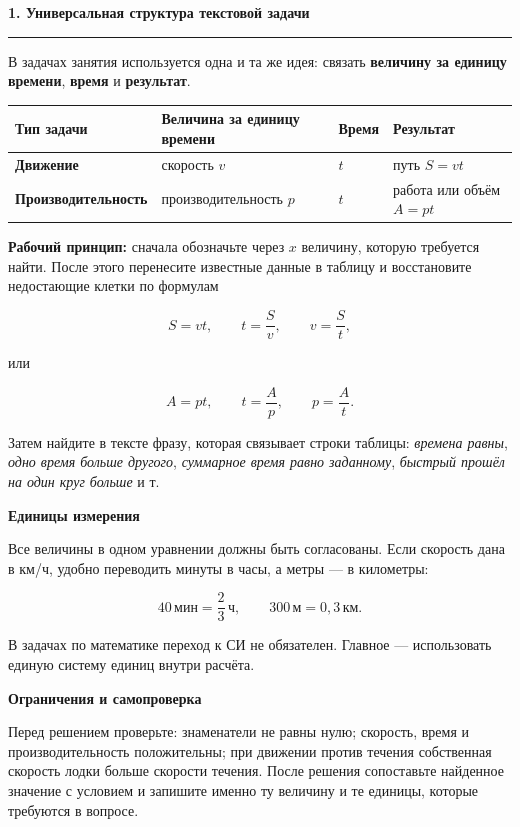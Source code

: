 \documentclass[a4paper,12pt]{article}
\newcommand{\sect}[1]{%
    \vspace{0.35em}%
    {\Large\bfseries\color{darkaccent}#1}\par
    \vspace{0.22em}%
    \color{linegray}\hrule
    \color{textgray}%
    \vspace{0.55em}%
}
\newcommand{\subsect}[1]{%
    \vspace{0.3em}%
    {\large\bfseries\color{accent}#1}\par
    \vspace{0.18em}%
}
\newcommand{\important}[1]{\textbf{\color{darkaccent}#1}}
\newcommand{\unit}[1]{\,\text{#1}}
\begin{document}
\clearpage


\sect{1. Универсальная структура текстовой задачи}

В задачах занятия используется одна и та же идея:
связать \important{величину за единицу времени},
\important{время} и \important{результат}.

\begin{table}[h!]
\centering
\begin{tabularx}{\linewidth}{@{}>{\bfseries}lXXX@{}}
\toprule
Тип задачи & Величина за единицу времени & Время & Результат \\
\midrule
Движение & скорость $v$ & $t$ & путь $S=vt$ \\
Производительность & производительность $p$ & $t$ & работа или объём $A=pt$ \\
\bottomrule
\end{tabularx}
\end{table}

\important{Рабочий принцип:}
сначала обозначьте через $x$ величину, которую требуется найти.
После этого перенесите известные данные в таблицу и восстановите
недостающие клетки по формулам

\[
S=vt,
\qquad
t=\frac{S}{v},
\qquad
v=\frac{S}{t},
\]

или

\[
A=pt,
\qquad
t=\frac{A}{p},
\qquad
p=\frac{A}{t}.
\]

Затем найдите в тексте фразу, которая связывает строки таблицы:
\emph{времена равны}, \emph{одно время больше другого},
\emph{суммарное время равно заданному},
\emph{быстрый прошёл на один круг больше} и т.

\subsect{Единицы измерения}

Все величины в одном уравнении должны быть согласованы.
Если скорость дана в км/ч, удобно переводить минуты в часы,
а метры --- в километры:

\[
40\unit{мин}=\frac{2}{3}\unit{ч},
\qquad
300\unit{м}=0{,}3\unit{км}.
\]

В задачах по математике переход к СИ не обязателен.
Главное --- использовать единую систему единиц внутри расчёта.

\subsect{Ограничения и самопроверка}

Перед решением проверьте: знаменатели не равны нулю; скорость, время и
производительность положительны; при движении против течения собственная
скорость лодки больше скорости течения. После решения сопоставьте найденное
значение с условием и запишите именно ту величину и те единицы, которые требуются в вопросе.
\end{document}
